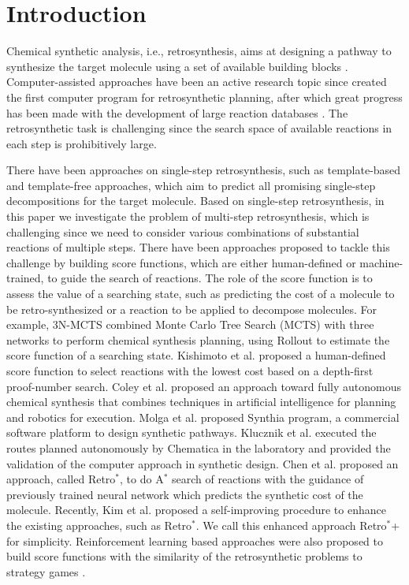 \documentclass[sn-mathphys,Numbered]{sn-jnl}
\begin{document}
\section{Introduction}\label{sec1}

Chemical synthetic analysis, i.e., retrosynthesis, aims at designing a pathway to synthesize the target molecule using a set of available building blocks \cite{corey1991}.
Computer-assisted approaches have been an active research topic since \citeauthor{corey1969} \cite{corey1969} created the first computer program for retrosynthetic planning, after which great progress \cite{segler2017,segler2018, schreck2019, DFPN-E2019, retro2020, Gottipati2020, RL2,2022} has been made with the development of large reaction databases \cite{lowe2017}. The retrosynthetic task is challenging since the search space of available reactions in each step is prohibitively large. 

There have been approaches on single-step retrosynthesis, such as template-based \cite{Coley2017, Dai2019,Coley2019} and template-free \cite{ Liu2017, Zheng2020, Somnath2020,Yan2020, Template-free,NIL-nature} approaches, which aim to predict all promising single-step decompositions for the target molecule. Based on single-step retrosynthesis, in this paper we investigate the problem of multi-step retrosynthesis, which is challenging since we need to consider various combinations of substantial reactions of multiple steps.
There have been approaches proposed to tackle this challenge by building score functions, which are either human-defined or machine-trained, to guide the search of reactions. 
The role of the score function is to assess the value of a searching state, such as predicting the cost of a molecule to be retro-synthesized or a reaction to be applied to decompose molecules. For example, 3N-MCTS \cite{segler2018} combined Monte Carlo Tree Search (MCTS) with three networks to perform chemical synthesis planning, using Rollout to estimate the score function of a searching state.
Kishimoto et al. \cite{DFPN-E2019} proposed a human-defined score function to select reactions with the lowest cost based on a depth-first proof-number search. 
Coley et al. \cite{science-robot} proposed an approach toward fully autonomous chemical synthesis that combines techniques in artificial intelligence for planning and robotics for execution.
Molga et al. \cite{Chematica} proposed Synthia program, a commercial software platform to design synthetic pathways.
Klucznik et al. \cite{Chematica2} executed the routes planned autonomously by Chematica in the laboratory and provided the validation of the computer approach in synthetic design.
Chen et al.\cite{retro2020} proposed an approach, called Retro$^*$, to do A$^*$ search of reactions with the guidance of previously trained neural network which predicts the synthetic cost of the molecule.
Recently, Kim et al. \cite{2022} proposed a self-improving procedure to enhance the existing approaches, such as Retro$^*$. We call this enhanced approach Retro$^*$+ for simplicity.
Reinforcement learning based approaches \citep{ schreck2019, RL2} were also proposed to build score functions with the similarity of the retrosynthetic problems to strategy games \citep{endofbegin}. 
\end{document}
